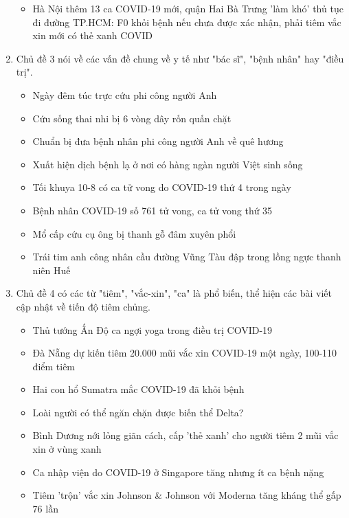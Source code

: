 \begin{enumerate}
\begin{itemize}
            \item Hà Nội thêm 13 ca COVID-19 mới, quận Hai Bà Trưng 'làm khó' thủ tục đi đường
            TP.HCM: F0 khỏi bệnh nếu chưa được xác nhận, phải tiêm vắc xin mới có thẻ xanh COVID
        \end{itemize}
    \item Chủ đề 3 nói về các vấn đề chung về y tế như "bác sĩ", "bệnh nhân"
        hay "điều trị".
        \begin{itemize}
            \item Ngày đêm túc trực cứu phi công người Anh
            \item Cứu sống thai nhi bị 6 vòng dây rốn quấn chặt
            \item Chuẩn bị đưa bệnh nhân phi công người Anh về quê hương
            \item Xuất hiện dịch bệnh lạ ở nơi có hàng ngàn người Việt sinh sống
            \item Tối khuya 10-8 có ca tử vong do COVID-19 thứ 4 trong ngày
            \item Bệnh nhân COVID-19 số 761 tử vong, ca tử vong thứ 35
            \item Mổ cấp cứu cụ ông bị thanh gỗ đâm xuyên phổi
            \item Trái tim anh công nhân cầu đường Vũng Tàu đập trong lồng ngực thanh niên Huế
        \end{itemize}
    \item Chủ đề 4 có các từ "tiêm", "vắc-xin", "ca" là phổ biến, thể hiện các
        bài viết cập nhật về tiến độ tiêm chủng.
        \begin{itemize}
            \item Thủ tướng Ấn Độ ca ngợi yoga trong điều trị COVID-19
            \item Đà Nẵng dự kiến tiêm 20.000 mũi vắc xin COVID-19 một ngày, 100-110 điểm tiêm
            \item Hai con hổ Sumatra mắc COVID-19 đã khỏi bệnh
            \item Loài người có thể ngăn chặn được biến thể Delta?
            \item Bình Dương nới lỏng giãn cách, cấp 'thẻ xanh' cho người tiêm 2 mũi vắc xin ở vùng xanh
            \item Ca nhập viện do COVID-19 ở Singapore tăng nhưng ít ca bệnh nặng
            \item Tiêm 'trộn' vắc xin Johnson \& Johnson với Moderna tăng kháng thể gấp 76 lần
        \end{itemize}

\end{enumerate}
